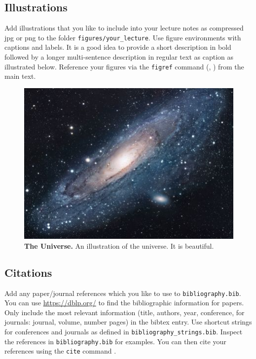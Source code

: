 \documentclass{article}
\begin{document}
\subsection{Illustrations}

Add illustrations that you like to include into your lecture notes as compressed jpg or png to the folder \texttt{figures/your\_lecture}. Use figure environments with captions and labels. It is a good idea to provide a short description in bold followed by a longer multi-sentence description in regular text as caption as illustrated below. Reference your figures via the \texttt{figref} command (\eg, ) from the main text.

\begin{figure}[h]
\centering
\includegraphics[width=0.8\linewidth]{figures/universe}
\caption{\textbf{The Universe.} An illustration of the universe. It is beautiful.}
\label{fig:universe}
\end{figure}

\subsection{Citations}

Add any paper/journal references which you like to use to \texttt{bibliography.bib}. You can use \url{https://dblp.org/} to find the bibliographic information for papers. Only include the most relevant information (title, authors, year, conference, for journals: journal, volume, number pages) in the bibtex entry. Use shortcut strings for conferences and journals as defined in \texttt{bibliography\_strings.bib}. Inspect the references in \texttt{bibliography.bib} for examples. You can then cite your references using the \texttt{cite} command \cite{Rumelhart1986NATURE}.
\end{document}
